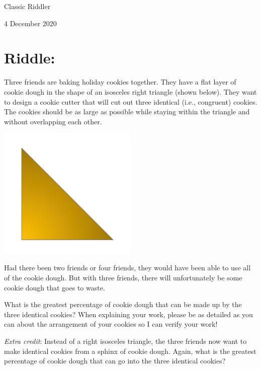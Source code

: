 \documentclass{article}
\begin{document}
\pagestyle{empty} %

\begin{center}
{\LARGE Classic Riddler}

\vspace{0.15in}

{\Large 4 December 2020}
\end{center}


\section*{Riddle:}

Three friends are baking holiday cookies together.
They have a flat layer of cookie dough in the shape of an isosceles right triangle (shown below).
They want to design a cookie cutter that will cut out three identical (i.e., congruent) cookies.
The cookies should be as large as possible while staying within the triangle and without overlapping each other.

\begin{center}
\includegraphics[width=0.5\textwidth]{triangle.png}
\end{center}

Had there been two friends or four friends, they would have been able to use all of the cookie dough.
But with three friends, there will unfortunately be some cookie dough that goes to waste.

What is the greatest percentage of cookie dough that can be made up by the three identical cookies?
When explaining your work, please be as detailed as you can about the arrangement of your cookies so I can verify your work!

\textit{Extra credit}: Instead of a right isosceles triangle, the three friends now want to make identical cookies from a sphinx of cookie dough.
Again, what is the greatest percentage of cookie dough that can go into the three identical cookies?
\end{document}
